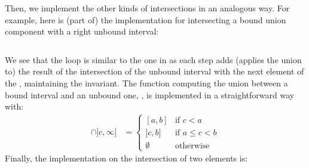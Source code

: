 Then, we implement the other kinds of intersections in an analogous way. For example,
here is (part of) the implementation for intersecting a bound union component with a right
unbound interval:
%
\inputminted{\whyml}{why3code/inter_up_bound.mlw}
%
We see that the loop is similar to the one in  as each step adds
(applies the union to) the result of the intersection of the unbound interval with the
next element of the , maintaining the invariant.
%
The function computing the union between a bound interval and an unbound one,
, is implemented in a straightforward way with:
%
\begin{align*}
  [a, b] \cap ]c, \infty] &=
  \begin{cases}
    [a, b]  & \text{if } c < a \\
    ]c, b]  & \text{if } a \le c < b \\
    \emptyset & \text{otherwise}
  \end{cases}
\end{align*}
%
Finally, the implementation on the intersection of two  elements is:
\inputminted{\whyml}{why3code/inter.mlw}


